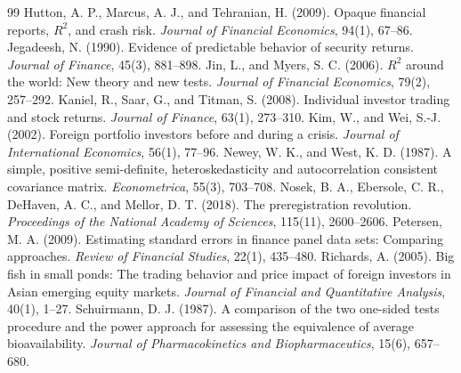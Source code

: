 \documentclass[11pt]{article}
\begin{document}
\begin{thebibliography}{99}
 Hutton, A. P., Marcus, A. J., and Tehranian, H. (2009). Opaque financial reports, $R^2$, and crash risk. \textit{Journal of Financial Economics}, 94(1), 67--86.
 Jegadeesh, N. (1990). Evidence of predictable behavior of security returns. \textit{Journal of Finance}, 45(3), 881--898.
 Jin, L., and Myers, S. C. (2006). $R^2$ around the world: New theory and new tests. \textit{Journal of Financial Economics}, 79(2), 257--292.
 Kaniel, R., Saar, G., and Titman, S. (2008). Individual investor trading and stock returns. \textit{Journal of Finance}, 63(1), 273--310.
 Kim, W., and Wei, S.-J. (2002). Foreign portfolio investors before and during a crisis. \textit{Journal of International Economics}, 56(1), 77--96.
 Newey, W. K., and West, K. D. (1987). A simple, positive semi-definite, heteroskedasticity and autocorrelation consistent covariance matrix. \textit{Econometrica}, 55(3), 703--708.
 Nosek, B. A., Ebersole, C. R., DeHaven, A. C., and Mellor, D. T. (2018). The preregistration revolution. \textit{Proceedings of the National Academy of Sciences}, 115(11), 2600--2606.
 Petersen, M. A. (2009). Estimating standard errors in finance panel data sets: Comparing approaches. \textit{Review of Financial Studies}, 22(1), 435--480.
 Richards, A. (2005). Big fish in small ponds: The trading behavior and price impact of foreign investors in Asian emerging equity markets. \textit{Journal of Financial and Quantitative Analysis}, 40(1), 1--27.
 Schuirmann, D. J. (1987). A comparison of the two one-sided tests procedure and the power approach for assessing the equivalence of average bioavailability. \textit{Journal of Pharmacokinetics and Biopharmaceutics}, 15(6), 657--680.
\end{thebibliography}

\appendix
\end{document}

